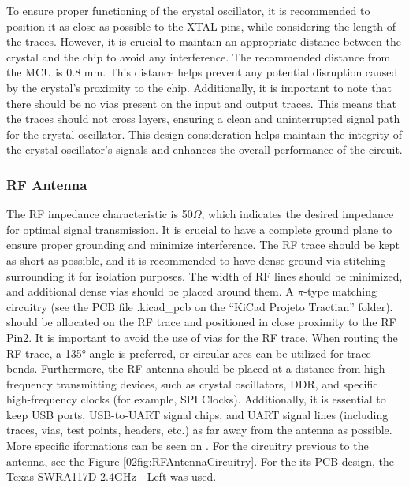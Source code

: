 To ensure proper functioning of the crystal oscillator, it is recommended to position it as close as possible to 
the XTAL pins, while considering the length of the traces. However, it is crucial to maintain an appropriate distance 
between the crystal and the chip to avoid any interference. The recommended distance from the MCU is 0.8 mm. 
This distance helps prevent any potential disruption caused by the crystal's  proximity to the chip. Additionally, it 
is important to note that there should be no vias present on the input and output traces. This means that the traces 
should not cross layers, ensuring a clean and uninterrupted signal path for the crystal oscillator. 
This design consideration helps maintain the integrity of the crystal oscillator's signals and enhances the overall 
performance of the circuit.

\subsubsection{RF Antenna}\label{03Sub:RFAntenna}

The RF impedance characteristic is 50$\Omega$, which indicates the desired impedance for optimal signal transmission. 
It is crucial to have a complete ground plane to ensure proper grounding and minimize interference. The RF trace should be kept as 
short as possible, and it is recommended to have dense ground via stitching surrounding it for isolation purposes. The width of RF 
lines should be minimized, and additional dense vias should be placed around them. A $\pi$-type matching circuitry (see the PCB
file .kicad\_pcb on the ``KiCad Projeto Tractian'' folder).
should be allocated 
on the RF trace and positioned in close proximity to the RF Pin2. It is important to avoid the use of vias for the RF trace. When routing 
the RF trace, a 135° angle is preferred, or circular arcs can be utilized for trace bends. Furthermore, the RF antenna should be placed at 
a distance from high-frequency transmitting devices, such as crystal oscillators, DDR, and specific high-frequency clocks (for example,
SPI Clocks). Additionally, it is essential to keep USB ports, USB-to-UART signal chips, and UART signal lines (including traces, vias, 
test points, headers, etc.) as far away from the antenna as possible. More specific iformations can be seen on \cite{ESP8266HGL}.
For the circuitry previous to the antenna, see the Figure \ref{02fig:RFAntennaCircuitry}. For the its PCB design, the
Texas SWRA117D 2.4GHz - Left \cite{TexasRFAntenna} was used. \\ 

